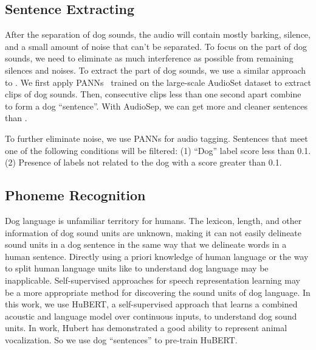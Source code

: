 \subsection{Sentence Extracting}
After the separation of dog sounds, the 
audio will contain mostly barking, silence, and a small amount of noise that can't be separated. To focus on the part of dog sounds, we need to eliminate as much interference as possible from remaining silences and noises. To extract the part of dog sounds, we use a similar approach to \citet{huang2023transcribing}. We first apply PANNs~\citep{kong2020panns} trained on the large-scale AudioSet dataset to extract clips of dog sounds. Then, consecutive clips less than one second apart combine to form a dog ``sentence''. With AudioSep, we can get more and cleaner sentences than \citet{huang2023transcribing}.

To further eliminate noise, we use PANNs for audio tagging. Sentences that meet one of the following conditions will be filtered: (1) ``Dog'' label score less than 0.1. (2) Presence of labels not related to the dog with a score greater than 0.1.

\subsection{Phoneme Recognition}

Dog language is unfamiliar territory for humans. The lexicon, length, and other information of dog sound units are unknown, making it can not easily delineate sound units in a dog sentence in the same way that we delineate words in a human sentence. Directly using a priori knowledge of human language or the way to split human language units like \citet{huang2023transcribing} to understand dog language may be inapplicable. Self-supervised approaches for speech representation learning may be a more appropriate method for discovering the sound units of dog language. In this work, we use HuBERT, a self-supervised approach that learns a combined acoustic and language model over continuous inputs, to understand dog sound units. In  work, Hubert has demonstrated a good ability to represent animal vocalization. So we use dog ``sentences'' to pre-train HuBERT. 

